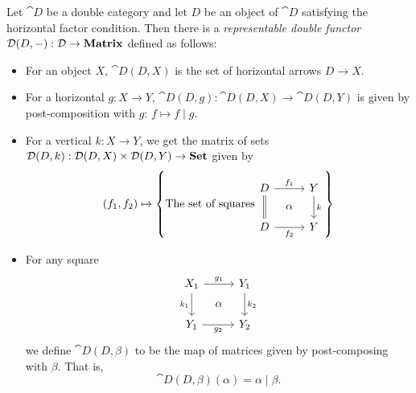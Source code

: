 \documentclass[DynamicalBook]{subfiles}
\begin{document}
\begin{theorem}\label{thm:representable.double.functor}
  Let $\cat{D}$ be a double category and let $D$ be an object of $\cat{D}$
  satisfying the horizontal factor condition. Then there is a
  \emph{representable double functor} $\mathcal{D}(D, -) : \mathcal{D} \to \textbf{Matrix}$
  defined as follows:
  \begin{itemize}
    \item For an object $X$, $\cat{D}(D, X)$ is the set of horizontal arrows $D
      \to X$.
    \item For a horizontal $g : X \to Y$, $\cat{D}(D, g) : \cat{D}(D, X) \to
      \cat{D}(D, Y)$ is given by post-composition with $g$: $f \mapsto f \mid g$.
    \item For a vertical $k : X \to Y$, we get the matrix of sets $\mathcal{D}(D, k)
      : \mathcal{D}(D, X) \times \mathcal{D}(D, Y) \to \textbf{Set}$ given by
      \[
        (f_1, f_2) \mapsto \left\{\mbox{The set of squares}
        \begin{tikzcd}[sep=tiny]
          D \ar[dd, equals] \ar[rr, "f_1"] & & Y \ar[dd, "k"] \\
           & \alpha & \\
          D \ar[rr, "f_2"'] & & Y  
        \end{tikzcd}
        \right\}
      \]
    \item For any square
      \[
        \begin{tikzcd}[sep=tiny]
          X_1 \ar[dd, "k_1"'] \ar[rr, "g_1"] & & Y_1 \ar[dd, "k_2"] \\
           & \alpha & \\
          Y_1 \ar[rr, "g_2"'] & & Y_2  
        \end{tikzcd}
      \]
      we define $\cat{D}(D, \beta)$ to be the map of matrices given by
      post-composing with $\beta$. That is,
      $$\cat{D}(D, \beta)(\alpha) = \alpha \mid \beta.$$
  \end{itemize}
\end{theorem}
\end{document}
